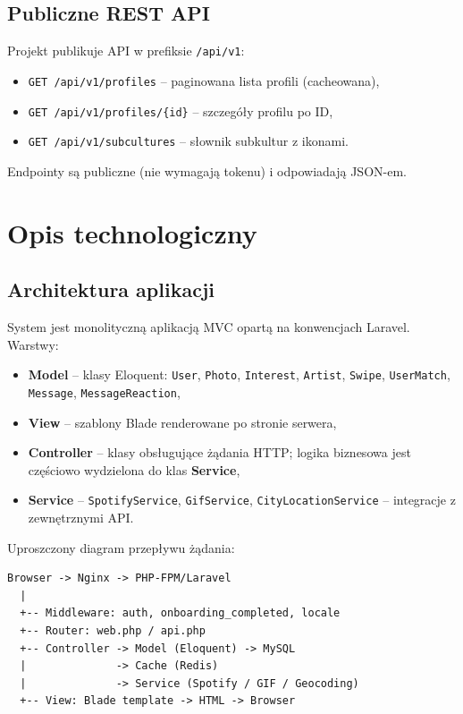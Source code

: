 \documentclass[12pt,a4paper]{article}
\begin{document}
\subsection{Publiczne REST API}

Projekt publikuje API w prefiksie \texttt{/api/v1}:
\begin{itemize}
    \item \texttt{GET /api/v1/profiles} -- paginowana lista profili (cacheowana),
    \item \texttt{GET /api/v1/profiles/\{id\}} -- szczegóły profilu po ID,
    \item \texttt{GET /api/v1/subcultures} -- słownik subkultur z ikonami.
\end{itemize}

Endpointy są publiczne (nie wymagają tokenu) i odpowiadają JSON-em.

\section{Opis technologiczny}

\subsection{Architektura aplikacji}

System jest monolityczną aplikacją MVC opartą na konwencjach Laravel. Warstwy:

\begin{itemize}
    \item \textbf{Model} -- klasy Eloquent: \texttt{User}, \texttt{Photo}, \texttt{Interest}, \texttt{Artist}, \texttt{Swipe}, \texttt{UserMatch}, \texttt{Message}, \texttt{MessageReaction},
    \item \textbf{View} -- szablony Blade renderowane po stronie serwera,
    \item \textbf{Controller} -- klasy obsługujące żądania HTTP; logika biznesowa jest częściowo wydzielona do klas \textbf{Service},
    \item \textbf{Service} -- \texttt{SpotifyService}, \texttt{GifService}, \texttt{CityLocationService} -- integracje z zewnętrznymi API.
\end{itemize}

Uproszczony diagram przepływu żądania:

\begin{lstlisting}[language={}]
Browser -> Nginx -> PHP-FPM/Laravel
  |
  +-- Middleware: auth, onboarding_completed, locale
  +-- Router: web.php / api.php
  +-- Controller -> Model (Eloquent) -> MySQL
  |              -> Cache (Redis)
  |              -> Service (Spotify / GIF / Geocoding)
  +-- View: Blade template -> HTML -> Browser
\end{lstlisting}
\end{document}
